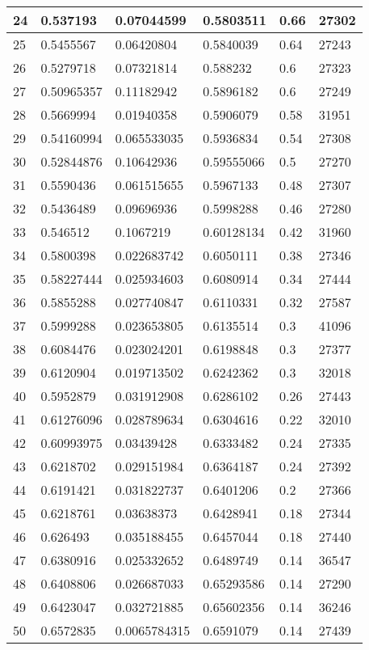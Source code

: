 \begin{longtable}{|l|l|l|l|l|l|}
24 & 0.537193 & 0.07044599 & 0.5803511 & 0.66 & 27302 \\ \hline 
25 & 0.5455567 & 0.06420804 & 0.5840039 & 0.64 & 27243 \\ \hline 
26 & 0.5279718 & 0.07321814 & 0.588232 & 0.6 & 27323 \\ \hline 
27 & 0.50965357 & 0.11182942 & 0.5896182 & 0.6 & 27249 \\ \hline 
28 & 0.5669994 & 0.01940358 & 0.5906079 & 0.58 & 31951 \\ \hline 
29 & 0.54160994 & 0.065533035 & 0.5936834 & 0.54 & 27308 \\ \hline 
30 & 0.52844876 & 0.10642936 & 0.59555066 & 0.5 & 27270 \\ \hline 
31 & 0.5590436 & 0.061515655 & 0.5967133 & 0.48 & 27307 \\ \hline 
32 & 0.5436489 & 0.09696936 & 0.5998288 & 0.46 & 27280 \\ \hline 
33 & 0.546512 & 0.1067219 & 0.60128134 & 0.42 & 31960 \\ \hline 
34 & 0.5800398 & 0.022683742 & 0.6050111 & 0.38 & 27346 \\ \hline 
35 & 0.58227444 & 0.025934603 & 0.6080914 & 0.34 & 27444 \\ \hline 
36 & 0.5855288 & 0.027740847 & 0.6110331 & 0.32 & 27587 \\ \hline 
37 & 0.5999288 & 0.023653805 & 0.6135514 & 0.3 & 41096 \\ \hline 
38 & 0.6084476 & 0.023024201 & 0.6198848 & 0.3 & 27377 \\ \hline 
39 & 0.6120904 & 0.019713502 & 0.6242362 & 0.3 & 32018 \\ \hline 
40 & 0.5952879 & 0.031912908 & 0.6286102 & 0.26 & 27443 \\ \hline 
41 & 0.61276096 & 0.028789634 & 0.6304616 & 0.22 & 32010 \\ \hline 
42 & 0.60993975 & 0.03439428 & 0.6333482 & 0.24 & 27335 \\ \hline 
43 & 0.6218702 & 0.029151984 & 0.6364187 & 0.24 & 27392 \\ \hline 
44 & 0.6191421 & 0.031822737 & 0.6401206 & 0.2 & 27366 \\ \hline 
45 & 0.6218761 & 0.03638373 & 0.6428941 & 0.18 & 27344 \\ \hline 
46 & 0.626493 & 0.035188455 & 0.6457044 & 0.18 & 27440 \\ \hline 
47 & 0.6380916 & 0.025332652 & 0.6489749 & 0.14 & 36547 \\ \hline 
48 & 0.6408806 & 0.026687033 & 0.65293586 & 0.14 & 27290 \\ \hline 
49 & 0.6423047 & 0.032721885 & 0.65602356 & 0.14 & 36246 \\ \hline 
50 & 0.6572835 & 0.0065784315 & 0.6591079 & 0.14 & 27439 \\ \hline 
\end{longtable}